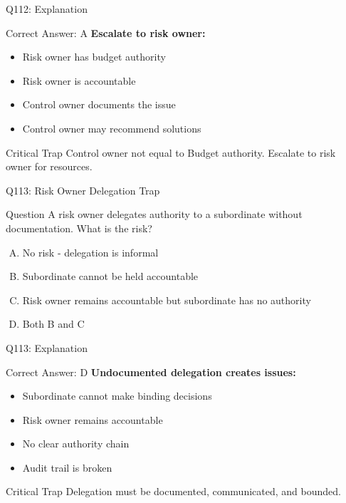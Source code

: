 \documentclass{beamer}
\begin{document}
	\begin{frame}{Q112: Explanation}
		\begin{block}{Correct Answer: A}
			\textbf{Escalate to risk owner:}
			\begin{itemize}
				\item Risk owner has budget authority
				\item Risk owner is accountable
				\item Control owner documents the issue
				\item Control owner may recommend solutions
			\end{itemize}
		\end{block}
		\begin{alertblock}{Critical Trap}
			Control owner not equal to Budget authority.
			Escalate to risk owner for resources.
		\end{alertblock}
	\end{frame}
	
	\begin{frame}{Q113: Risk Owner Delegation Trap}
		\begin{block}{Question}
			A risk owner delegates authority to a subordinate without documentation. What is the risk?
		\end{block}
		\begin{enumerate}[(A)]
			\item No risk - delegation is informal
			\item Subordinate cannot be held accountable
			\item Risk owner remains accountable but subordinate has no authority
			\item Both B and C
		\end{enumerate}
	\end{frame}
	
	\begin{frame}{Q113: Explanation}
		\begin{block}{Correct Answer: D}
			\textbf{Undocumented delegation creates issues:}
			\begin{itemize}
				\item Subordinate cannot make binding decisions
				\item Risk owner remains accountable
				\item No clear authority chain
				\item Audit trail is broken
			\end{itemize}
		\end{block}
		\begin{alertblock}{Critical Trap}
			Delegation must be documented, communicated, and bounded.
		\end{alertblock}
	\end{frame}
	
\end{document}
